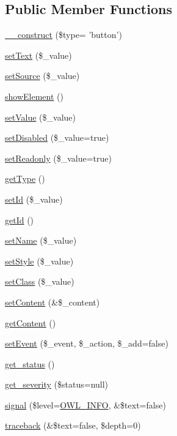 \subsection*{Public Member Functions}
\begin{DoxyCompactItemize}
\item 
\hyperlink{classFormFieldButtonPlugin_ac8e12626586b106c41c01c605034466e}{\_\-\_\-construct} (\$type= 'button')
\item 
\hyperlink{classFormFieldButtonPlugin_a7bceaf9096561137fb9056a815475025}{setText} (\$\_\-value)
\item 
\hyperlink{classFormFieldButtonPlugin_a2a8cf6a346965f8d264edd7cc293df7b}{setSource} (\$\_\-value)
\item 
\hyperlink{classFormFieldButtonPlugin_a029b1662ddc1652b2a571cb2b72421b7}{showElement} ()
\item 
\hyperlink{classFormFieldPlugin_af951a690345b35e616d204cf51e8899e}{setValue} (\$\_\-value)
\item 
\hyperlink{classFormFieldPlugin_a91fae1af7cc850ae97f3f79652824b8c}{setDisabled} (\$\_\-value=true)
\item 
\hyperlink{classFormFieldPlugin_a866f1fd589c30d9e5bd1e059e4b85905}{setReadonly} (\$\_\-value=true)
\item 
\hyperlink{classFormFieldPlugin_af55e88f21054dfc3a0092c10ef0fbe40}{getType} ()
\item 
\hyperlink{classBaseElement_a0c1ce3d1684ecb78960cf7a97278494e}{setId} (\$\_\-value)
\item 
\hyperlink{classBaseElement_a4a7aa583ee21af392908d7fd42fde790}{getId} ()
\item 
\hyperlink{classBaseElement_a39bafb3609d10048920c20242c2a04c5}{setName} (\$\_\-value)
\item 
\hyperlink{classBaseElement_a6b2b9ff69f6e92db82f91d9c55cda697}{setStyle} (\$\_\-value)
\item 
\hyperlink{classBaseElement_af6597b30fa9798878f6290271043dfa2}{setClass} (\$\_\-value)
\item 
\hyperlink{classBaseElement_a164a9c6e4ee68afa0ad343942ba54d28}{setContent} (\&\$\_\-content)
\item 
\hyperlink{classBaseElement_af8c86b93bcdcfbc415bf96c622dc5516}{getContent} ()
\item 
\hyperlink{classBaseElement_ad5789f45f16aaa144716ee8558069c31}{setEvent} (\$\_\-event, \$\_\-action, \$\_\-add=false)
\item 
\hyperlink{class__OWL_a99ec771fa2c5c279f80152cc09e489a8}{get\_\-status} ()
\item 
\hyperlink{class__OWL_adf9509ef96858be7bdd9414c5ef129aa}{get\_\-severity} (\$status=null)
\item 
\hyperlink{class__OWL_a51ba4a16409acf2a2f61f286939091a5}{signal} (\$level=\hyperlink{owl_8severitycodes_8php_a139328861128689f2f4def6a399d9057}{OWL\_\-INFO}, \&\$text=false)
\item 
\hyperlink{class__OWL_aa29547995d6741b7d2b90c1d4ea99a13}{traceback} (\&\$text=false, \$depth=0)
\end{DoxyCompactItemize}
